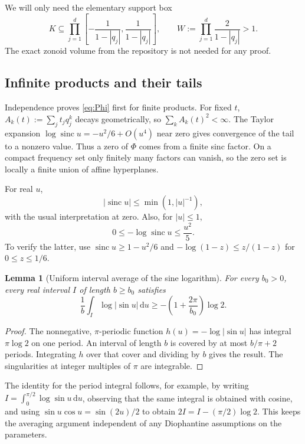 \documentclass[11pt,a4paper]{article}
\numberwithin{equation}{section}
\newtheorem{lemma}[theorem]{Lemma}
\theoremstyle{definition}
\theoremstyle{remark}\newtheorem{remark}[theorem]{Remark}
\newcommand{\dd}{\,\mathrm d}
\newcommand{\sinc}{\operatorname{sinc}}
\begin{document}
We will only need the elementary support box
\begin{equation}
 K\subseteq\prod_{j=1}^d
 \left[-\frac1{1-|q_j|},\frac1{1-|q_j|}\right],\qquad
 W:=\prod_{j=1}^d\frac2{1-|q_j|}>1.
 \label{eq:W}
\end{equation}
The exact zonoid volume from the repository is not needed for any proof.

\subsection{Infinite products and their tails}

Independence proves \eqref{eq:Phi} first for finite products. For fixed $t$,
$A_k(t):=\sum_jt_jq_j^k$ decays geometrically, so
$\sum_kA_k(t)^2<\infty$. The Taylor expansion
$\log\sinc u=-u^2/6+O(u^4)$ near zero gives convergence of the tail to a
nonzero value. Thus a zero of $\Phi$ comes from a finite sinc factor. On a
compact frequency set only finitely many factors can vanish, so the zero set
is locally a finite union of affine hyperplanes.

For real $u$,
\begin{equation}
 |\sinc u|\le\min(1,|u|^{-1}),
 \label{eq:sinc-upper}
\end{equation}
with the usual interpretation at zero. Also, for $|u|\le1$,
\begin{equation}
 0\le-\log\sinc u\le\frac{u^2}{5}.
 \label{eq:sinc-tail}
\end{equation}
To verify the latter, use $\sinc u\ge1-u^2/6$ and
$-\log(1-z)\le z/(1-z)$ for $0\le z\le1/6$.

\begin{lemma}[Uniform interval average of the sine logarithm]
\label{lem:logsine}
For every $b_0>0$, every real interval $I$ of length $b\ge b_0$ satisfies
\begin{equation}
 \frac1b\int_I\log|\sin u|\dd u\ge
       -\left(1+\frac{2\pi}{b_0}\right)\log2.
 \label{eq:logsine}
\end{equation}
\end{lemma}
\begin{proof}
The nonnegative, $\pi$-periodic function $h(u)=-\log|\sin u|$ has integral
$\pi\log2$ on one period. An interval of length $b$ is covered by at most
$b/\pi+2$ periods. Integrating $h$ over that cover and dividing by $b$ gives
the result. The singularities at integer multiples of $\pi$ are integrable.
\end{proof}

The identity for the period integral follows, for example, by writing
$I=\int_0^{\pi/2}\log\sin u\dd u$, observing that the same integral is obtained
with cosine, and using $\sin u\cos u=\sin(2u)/2$ to obtain
$2I=I-(\pi/2)\log2$. This keeps the averaging argument independent of any
Diophantine assumptions on the parameters.
\end{document}
